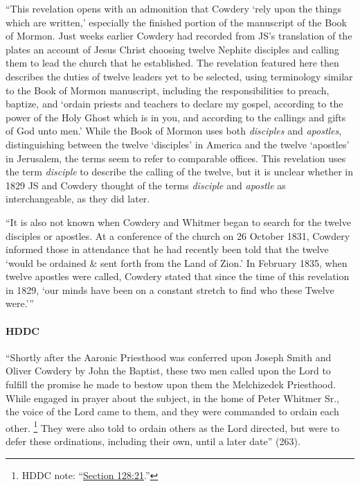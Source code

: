 			``This revelation opens with an admonition that Cowdery `rely upon the things which are written,' especially the finished portion of the manuscript of the Book of Mormon. Just weeks earlier Cowdery had recorded from JS's translation of the plates an account of Jesus Christ choosing twelve Nephite disciples and calling them to lead the church that he established. The revelation featured here then describes the duties of twelve leaders yet to be selected, using terminology similar to the Book of Mormon manuscript, including the responsibilities to preach, baptize, and `ordain priests and teachers to declare my gospel, according to the power of the Holy Ghost which is in you, and according to the callings and gifts of God unto men.' While the Book of Mormon uses both \textit{disciples} and \textit{apostles}, distinguishing between the twelve `disciples' in America and the twelve `apostles' in Jerusalem, the terms seem to refer to comparable offices. This revelation uses the term \textit{disciple} to describe the calling of the twelve, but it is unclear whether in 1829 JS and Cowdery thought of the terms \textit{disciple} and \textit{apostle} as interchangeable, as they did later.
			
			``It is also not known when Cowdery and Whitmer began to search for the twelve disciples or apostles. At a conference of the church on 26 October 1831, Cowdery informed those in attendance that he had recently been told that the twelve `would be ordained \& sent forth from the Land of Zion.' In February 1835, when twelve apostles were called, Cowdery stated that since the time of this revelation in 1829, `our minds have been on a constant stretch to find who these Twelve were.'''
			
		\paragraph{HDDC}
		
			``Shortly after the Aaronic Priesthood was conferred upon Joseph Smith and Oliver Cowdery by John the Baptist, these two men called upon the Lord to fulfill the promise he made to bestow upon them the Melchizedek Priesthood. While engaged in prayer about the subject, in the home of Peter Whitmer Sr., the voice of the Lord came to them, and they were commanded to ordain each other.%
				\footnote{%
					HDDC note: ``\hyperref[DC128-21]{Section 128:21}.''
					}
			They were also told to ordain others as the Lord directed, but were to defer these ordinations, including their own, until a later date'' (263).
			
